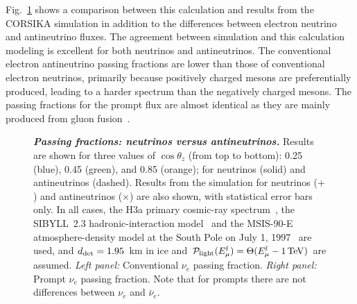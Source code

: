 Fig.~\ref{fig:nu-e-neutrino-vs-antineutrino} shows a comparison between this calculation and results from the CORSIKA simulation in addition to the differences between electron neutrino and antineutrino fluxes.
The agreement between simulation and this calculation modeling is excellent for
both neutrinos and antineutrinos.
The conventional electron antineutrino passing fractions are lower than those of conventional electron neutrinos, primarily because positively charged mesons are preferentially produced, leading to a harder spectrum than the negatively charged mesons.
The passing fractions for the prompt flux are almost identical as they are mainly produced from gluon fusion~\cite{Arguelles:2015wba}.

\begin{figure}
	\centering
	\caption{\textbf{\textit{Passing fractions: neutrinos versus antineutrinos.}} Results are shown for three values of $\cos\theta_z$ (from top to bottom): 0.25 (blue), 0.45 (green), and 0.85 (orange); for neutrinos (solid) and antineutrinos (dashed). Results from the \CORSIKA{} simulation for neutrinos ($+$) and antineutrinos ($\times$) are also shown, with statistical error bars only. In all cases, the H3a primary cosmic-ray spectrum~\cite{Gaisser:2011cc}, the SIBYLL~2.3 hadronic-interaction model~\cite{Engel:2015dxa, Riehn:2015oba} and the MSIS-90-E atmosphere-density model at the South Pole on July 1, 1997~\cite{Labitzke:1985, Hedin:1991} are used, and $d_{\rm det} = 1.95$~km in ice and ${\cal P}_{\rm light}(E_{\mu}^{\rm f}) = \Theta(E_{\mu}^{\rm f} - 1\,{\rm TeV})$ are assumed. \textit{Left panel:} Conventional $\nu_e$ passing fraction. \textit{Right panel:} Prompt $\nu_e$ passing fraction. Note that for prompts there are not differences between $\nu_e$ and $\bar\nu_e$.
	}
	\label{fig:nu-e-neutrino-vs-antineutrino}
\end{figure}


